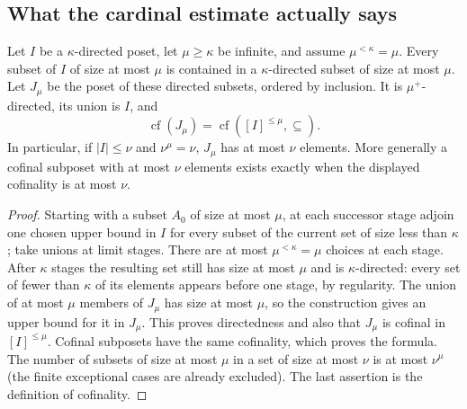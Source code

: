 \subsection{What the cardinal estimate actually says}
\begin{lemma}\label{cat:I2}
Let $I$ be a $\kappa$-directed poset, let $\mu\geq\kappa$ be infinite,
and assume $\mu^{<\kappa}=\mu$.  Every subset of $I$ of size at most
$\mu$ is contained in a $\kappa$-directed subset of size at most $\mu$.
Let $J_\mu$ be the poset of these directed subsets, ordered by inclusion.
It is $\mu^+$-directed, its union is $I$, and
\[
 \operatorname{cf}(J_\mu)
 =\operatorname{cf}([I]^{\leq\mu},\subseteq).
\]
In particular, if $|I|\leq\nu$ and $\nu^\mu=\nu$, $J_\mu$ has at most
$\nu$ elements.  More generally a cofinal subposet with at most $\nu$
elements exists exactly when the displayed cofinality is at most $\nu$.
\end{lemma}
\begin{proof}
Starting with a subset $A_0$ of size at most $\mu$, at each successor
stage adjoin one chosen upper bound in $I$ for every subset of the
current set of size less than $\kappa$; take unions at limit stages.
There are at most $\mu^{<\kappa}=\mu$ choices at each stage.  After
$\kappa$ stages the resulting set still has size at most $\mu$ and is
$\kappa$-directed: every set of fewer than $\kappa$ of its elements
appears before one stage, by regularity.  The union of at most $\mu$
members of $J_\mu$ has size at most $\mu$, so the construction gives
an upper bound for it in $J_\mu$.  This proves directedness and also
that $J_\mu$ is cofinal in $[I]^{\leq\mu}$.  Cofinal subposets have
the same cofinality, which proves the formula.  The number of subsets
of size at most $\mu$ in a set of size at most $\nu$ is at most
$\nu^\mu$ (the finite exceptional cases are already excluded).
The last assertion is the definition of cofinality.
\end{proof}

